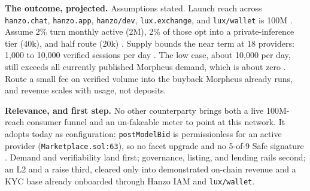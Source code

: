 \documentclass[11pt,a4paper]{article}
\newcommand{\code}[1]{\texttt{\small #1}}
\newcommand{\prov}[1]{{\color{muted}\scriptsize\sffamily[#1]}}
\begin{document}
\vspace{0.35ex}
\noindent\textbf{The outcome, projected.}
Assumptions stated. Launch reach across \code{hanzo.chat}, \code{hanzo.app}, \code{hanzo/dev},
\code{lux.exchange}, and \code{lux/wallet} is 100M \prov{client}. Assume 2\% turn monthly active
(2M), 2\% of those opt into a private-inference tier (40k), and half route (20k)
\prov{illustrative}. Supply bounds the near term at 18 providers: 1,000 to 10,000 verified
sessions per day \prov{illustrative}. The low case, about 10,000 per day, still exceeds all
currently published Morpheus demand, which is about zero \prov{verified}. Route a small fee on
verified volume into the buyback Morpheus already runs, and revenue scales with usage, not
deposits.

\vspace{0.35ex}
\noindent\textbf{Relevance, and first step.}
No other counterparty brings both a live 100M-reach consumer funnel and an un-fakeable meter to
point at this network. It adopts today as configuration: \code{postModelBid} is permissionless
for an active provider (\code{Marketplace.sol:63}), so no facet upgrade and no 5-of-9 Safe
signature \prov{verified}. Demand and verifiability land first; governance, listing, and lending
rails second; an L2 and a raise third, cleared only into demonstrated on-chain revenue and a KYC
base already onboarded through Hanzo IAM and \code{lux/wallet}.

\vspace{0.6ex}
\end{document}
